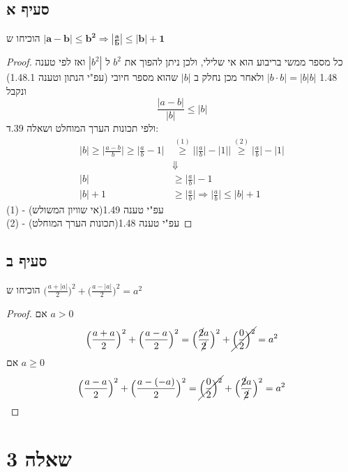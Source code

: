 \documentclass{article}
\begin{document}
	\subsection*{סעיף א}
	הוכיחו ש
	$\bm{|a-b| \leq b^2 \Rightarrow |\frac{a}{b}| \leq |b| + 1}$

	\begin{proof}

		כל מספר ממשי בריבוע הוא אי שלילי, ולכן ניתן להפוך את $b^2$ ל $|b^2|$ ואז לפי טענה 1.48 $|b \cdot b| = |b|b|$ ולאחר מכן נחלק ב $|b|$ שהוא מספר חיובי (עפ"י הנתון וטענה 1.48.1) ונקבל
		\[ \frac{|a-b| }{|b|} \leq |b| \]
		ולפי תכונות הערך המוחלט ושאלה 39.ד:
		\begin{align*}
			|b| \geq \Big| \frac{a-b}{b} \Big|
			\geq  \Big| \frac{a}{b}-1 \Big|
			&\overset{(1)}{\geq}
		 	\bigg| \Big| \frac{a}{b} \Big| - |1| \bigg|
			 \overset{(2)}{\geq}
		 	\Big| \frac{a}{b} \Big| - |1| \\
			 &\Downarrow \\
			|b| &\geq \Big| \frac{a}{b} \Big| -1 \\
			|b| + 1 &\geq \Big| \frac{a}{b}  \Big| \Rightarrow
			\Big| \frac{a}{b} \Big| \leq |b| + 1
		\end{align*}
		(1) - עפ"י טענה 1.49(אי שוויון המשולש) \\
		(2) - עפ"י טענה 1.48(תכונות הערך המוחלט)
	\end{proof}

	\subsection*{סעיף ב}
	הוכיחו ש
	$\big( \frac{a + |a|}{2} \big)^2 + \big( \frac{a - |a|}{2} \big)^2 = a^2$
	\begin{proof}
		אם $a > 0$
		\[
			\Big( \frac{a+a}{2} \Big)^2 + \Big( \frac{a-a}{2} \Big) ^2 =
			\Big( \frac{\cancel{2}a}{\cancel{2}} \Big)^2 + \cancel{\Big( \frac{0}{2} \Big)^2} = a^2
		\]
				אם $a \geq 0$
		\[
		\Big( \frac{a-a}{2} \Big)^2 + \Big( \frac{a-(-a)}{2} \Big) ^2 =
		\cancel{\Big( \frac{0}{2} \Big)^2} + \Big( \frac{\cancel{2}a}{\cancel{2}} \Big)^2 = a^2
		\]
	\end{proof}

	\pagebreak
	\section*{שאלה 3}
\end{document}
